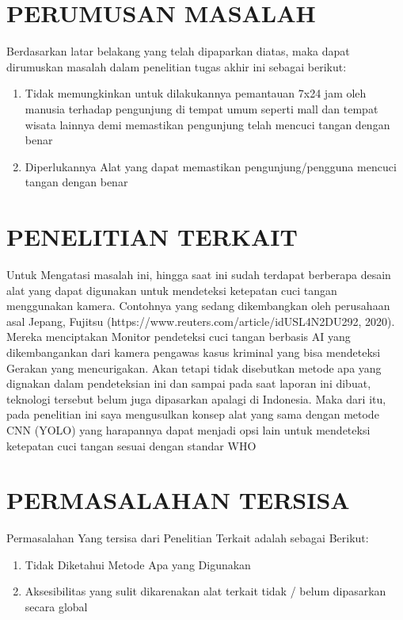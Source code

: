 \documentclass[a4paper]{article}
\begin{document}
\section{PERUMUSAN MASALAH}
\hspace{7mm}Berdasarkan latar belakang yang telah dipaparkan diatas, maka dapat dirumuskan masalah dalam penelitian tugas akhir ini sebagai berikut:
\begin{enumerate}
	\item Tidak memungkinkan untuk dilakukannya pemantauan 7x24 jam oleh manusia terhadap pengunjung di tempat umum seperti mall dan tempat wisata lainnya demi memastikan pengunjung telah mencuci tangan dengan benar
	\item Diperlukannya Alat yang dapat memastikan pengunjung/pengguna mencuci tangan dengan benar
\end{enumerate}

\section{PENELITIAN TERKAIT}
\hspace{7mm}Untuk Mengatasi masalah ini, hingga saat ini sudah terdapat berberapa desain alat yang dapat digunakan untuk mendeteksi ketepatan cuci tangan menggunakan kamera. Contohnya yang sedang dikembangkan oleh perusahaan asal Jepang, Fujitsu (https://www.reuters.com/article/idUSL4N2DU292, 2020). Mereka menciptakan Monitor pendeteksi cuci tangan berbasis AI yang dikembangankan dari kamera pengawas kasus kriminal yang bisa mendeteksi Gerakan yang mencurigakan. Akan tetapi tidak disebutkan metode apa yang dignakan dalam pendeteksian ini dan sampai pada saat laporan ini dibuat, teknologi tersebut belum juga dipasarkan apalagi di Indonesia. Maka dari itu, pada penelitian ini saya mengusulkan konsep alat yang sama dengan metode CNN (YOLO) yang harapannya dapat menjadi opsi lain untuk mendeteksi ketepatan cuci tangan sesuai dengan standar WHO

\section{PERMASALAHAN TERSISA}
\hspace{7mm}Permasalahan Yang tersisa dari Penelitian Terkait adalah sebagai Berikut:
\begin{enumerate}
	\item Tidak Diketahui Metode Apa yang Digunakan
	\item Aksesibilitas yang sulit dikarenakan alat terkait tidak / belum dipasarkan secara global
\end{enumerate}
\end{document}
